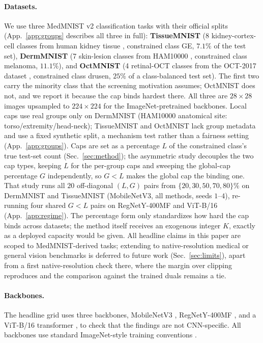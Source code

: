 \documentclass[10pt]{article}
\begin{document}
\paragraph{Datasets.}
We use three MedMNIST v2 \citep{yang2023medmnist} classification tasks with
their official splits %
{(App.~\ref{app:groups} describes all three in full)}:
\textbf{TissueMNIST} (8 kidney-cortex-cell classes from human kidney
tissue \citep{woloshuk2021situ}, constrained class GE, $7.1\%$ of the
test set), \textbf{DermMNIST} (7 skin-lesion classes from
HAM10000 \citep{tschandl2018ham10000}, constrained class melanoma,
$11.1\%$), and \textbf{OctMNIST} (4 retinal-OCT classes from the
OCT-2017 dataset \citep{kermany2018identifying}, constrained class
drusen, $25\%$ of a class-balanced test set). The first two carry the minority class that
the screening motivation assumes; OctMNIST does not, and we report it
because the cap binds hardest there. All three are $28{\times}28$ images
upsampled to $224{\times}224$ for the ImageNet-pretrained backbones. Local
caps use real groups only on DermMNIST (HAM10000 anatomical site:
torso/extremity/head-neck); TissueMNIST and OctMNIST lack group metadata and
use a fixed synthetic split, a mechanism test rather than a fairness
setting (App.~\ref{app:groups}). Caps are set as a percentage $L$ of the
constrained class's true test-set count (Sec.~\ref{sec:method}); the
asymmetric study decouples the two cap types, keeping $L$ for the per-group
caps and sweeping the global-cap percentage $G$ independently, so $G{<}L$
makes the global cap the binding one. That study runs all $20$ off-diagonal
$(L,G)$ pairs from $\{20,30,50,70,80\}\%$ on DermMNIST and TissueMNIST
(MobileNetV3, all methods, seeds $1$--$4$), re-running four shared $G{<}L$
pairs on RegNetY-400MF and ViT-B/16 (App.~\ref{app:regime}). The
percentage form only standardizes how hard the cap binds across datasets;
the method itself receives an exogenous integer $K$, exactly as a deployed
capacity would be given. All headline claims in this paper are scoped to
MedMNIST-derived tasks; extending to native-resolution medical or general
vision benchmarks is deferred to future work (Sec.~\ref{sec:limits}),
apart from a first native-resolution check there, where the margin over clipping
reproduces and the comparison against the trained duals remains a tie.

\paragraph{Backbones.}
The headline grid uses three backbones, MobileNetV3
\citep{howard2019searching}, RegNetY-400MF \citep{radosavovic2020designing},
and a ViT-B/16 transformer \citep{dosovitskiy2020image}, to check that the
findings are not CNN-specific. All backbones use standard ImageNet-style
training conventions \citep{he2016deep}.
\end{document}
